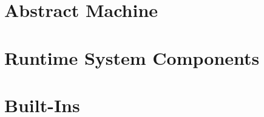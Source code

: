 \documentclass[11pt,a4paper]{book}
\begin{document}
\chapter{Abstract Machine}


\chapter{Runtime System Components}



%


\chapter{Built-Ins}


\appendix



\newpage
\printindex
\newpage


\end{document}
